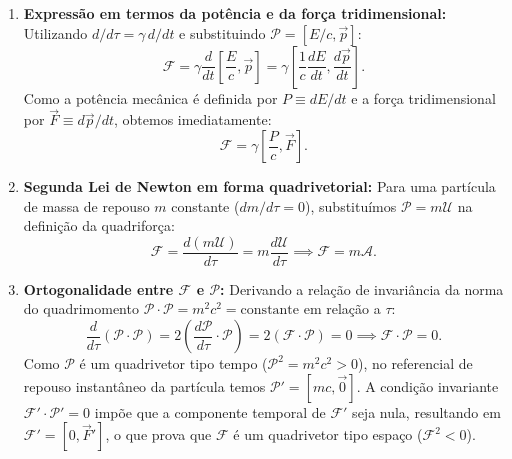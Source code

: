 \documentclass[11pt, a4paper]{article}
\begin{document}
\begin{enumerate}[label=\alph*)]
    \item \textbf{Expressão em termos da potência e da força tridimensional:} Utilizando $d/d\tau = \gamma \, d/dt$ e substituindo $\mathcal{P} = [E/c, \vec{p}]$:
    \begin{equation}
    \mathcal{F} = \gamma \frac{d}{dt} \left[ \frac{E}{c}, \vec{p} \right] = \gamma \left[ \frac{1}{c} \frac{dE}{dt}, \frac{d\vec{p}}{dt} \right].
    \end{equation}
    Como a potência mecânica é definida por $P \equiv dE/dt$ e a força tridimensional por $\vec{F} \equiv d\vec{p}/dt$, obtemos imediatamente:
    \begin{equation}
    \mathcal{F} = \gamma \left[ \frac{P}{c}, \vec{F} \right].
    \end{equation}

    \item \textbf{Segunda Lei de Newton em forma quadrivetorial:} Para uma partícula de massa de repouso $m$ constante ($dm/d\tau = 0$), substituímos $\mathcal{P} = m \mathcal{U}$ na definição da quadriforça:
    \begin{equation}
    \mathcal{F} = \frac{d(m\mathcal{U})}{d\tau} = m \frac{d\mathcal{U}}{d\tau} \implies \mathcal{F} = m \mathcal{A}.
    \end{equation}

    \item \textbf{Ortogonalidade entre $\mathcal{F}$ e $\mathcal{P}$:} Derivando a relação de invariância da norma do quadrimomento $\mathcal{P} \cdot \mathcal{P} = m^2 c^2 = \text{constante}$ em relação a $\tau$:
    \begin{equation}
    \frac{d}{d\tau} (\mathcal{P} \cdot \mathcal{P}) = 2 \left( \frac{d\mathcal{P}}{d\tau} \cdot \mathcal{P} \right) = 2 (\mathcal{F} \cdot \mathcal{P}) = 0 \implies \mathcal{F} \cdot \mathcal{P} = 0.
    \end{equation}
    Como $\mathcal{P}$ é um quadrivetor tipo tempo ($\mathcal{P}^2 = m^2 c^2 > 0$), no referencial de repouso instantâneo da partícula temos $\mathcal{P}' = [mc, \vec{0}]$. A condição invariante $\mathcal{F}' \cdot \mathcal{P}' = 0$ impõe que a componente temporal de $\mathcal{F}'$ seja nula, resultando em $\mathcal{F}' = [0, \vec{F}']$, o que prova que $\mathcal{F}$ é um quadrivetor tipo espaço ($\mathcal{F}^2 < 0$).


\end{enumerate}
\end{document}
